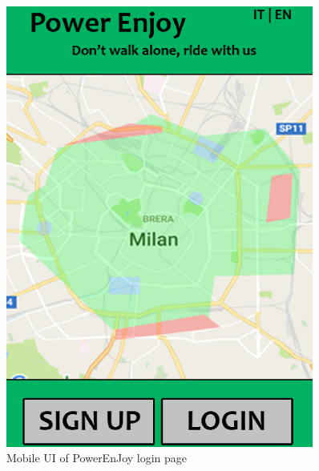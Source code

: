 \begin{figure}[t]
	\centering
	\begin{minipage}{0.45\textwidth}
		\centering
		\includegraphics[width=0.9\textwidth]{figures/mobile_unlogged.eps}
		\caption{Mobile UI of PowerEnJoy login page}
		\label{fig:mobile_unlogged}
	\end{minipage}\hfill
	\begin{minipage}{0.45\textwidth}
		\centering

\end{minipage}
\end{figure}
